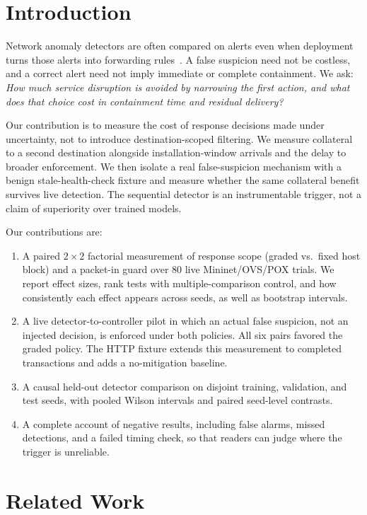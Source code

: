 \documentclass[conference]{IEEEtran}
\begin{document}
\section{Introduction}
Network anomaly detectors are often compared on alerts even when deployment turns those alerts
into forwarding rules~\cite{sommer2010closed,scotthayward2016survey}. A false suspicion need not
be costless, and a correct alert need not imply immediate or complete containment. We ask:
\emph{How much service disruption is avoided by narrowing the first action, and what does that
choice cost in containment time and residual delivery?}

Our contribution is to measure the cost of response decisions made under uncertainty,
not to introduce destination-scoped filtering. We measure collateral to a second
destination alongside installation-window arrivals and the delay to broader enforcement.
We then isolate a real false-suspicion mechanism with a benign stale-health-check
fixture and measure whether the same collateral benefit survives live detection. The sequential
detector is an instrumentable trigger, not a claim of superiority over trained models.

Our contributions are:
\begin{enumerate}
\item A paired $2\times2$ factorial measurement of response scope (graded vs.\ fixed host
block) and a packet-in guard over 80 live Mininet/OVS/POX trials. We report effect sizes,
rank tests with multiple-comparison control, and how consistently each effect appears
across seeds, as well as bootstrap intervals.
\item A live detector-to-controller pilot in which an actual false suspicion, not an
injected decision, is enforced under both policies. All six pairs favored the graded policy.
The HTTP fixture extends this measurement to completed transactions and adds a
no-mitigation baseline.
\item A causal held-out detector comparison on disjoint training, validation, and test
seeds, with pooled Wilson intervals and paired seed-level contrasts.
\item A complete account of negative results, including false alarms, missed detections,
and a failed timing check, so that readers can judge where the trigger is unreliable.
\end{enumerate}

\section{Related Work}
\end{document}

